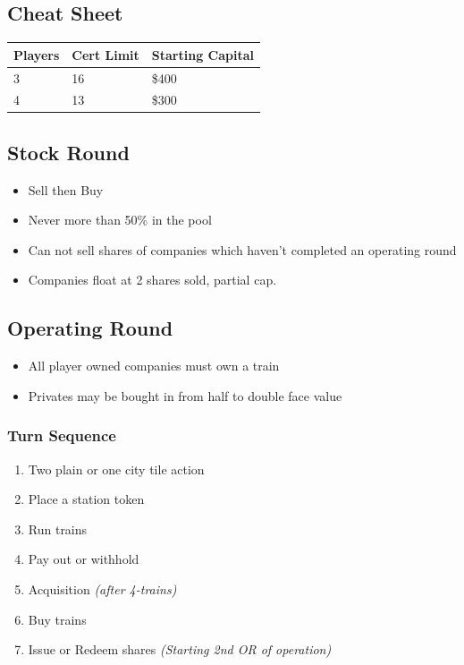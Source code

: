 \documentclass[letterpaper]{article}
\begin{document}
\thispagestyle{empty}
\begin{multicols}{2}
    \section*{Cheat Sheet}
    \begin{tabular}{l|l|l}
      \hline
      \textbf{Players} & \textbf{Cert Limit} & \textbf{Starting Capital} \\
      \hline
      \hline
      3 & 16 & \$400 \\
      4 & 13 & \$300 \\
      \hline
    \end{tabular}
    \subsection*{Stock Round}
    \begin{itemize}
    \item Sell then Buy
    \item Never more than 50\% in the pool
    \item Can not sell shares of companies which haven't completed an operating round
    \item Companies float at 2 shares sold, partial cap.
    \end{itemize}
    \subsection*{Operating Round}

    \begin{itemize}
    \item All player owned companies must own a train
    \item Privates may be bought in from half to double face value
    \end{itemize}

    \subsubsection*{Turn Sequence}
    \begin{enumerate}
    \item Two plain or one city tile action
    \item Place a station token
    \item Run trains
    \item Pay out or withhold
    \item Acquisition \textit{(after 4-trains)}
    \item Buy trains
    \item Issue or Redeem shares \textit{(Starting 2nd OR of operation)}
    \end{enumerate}


\end{multicols}
\end{document}
